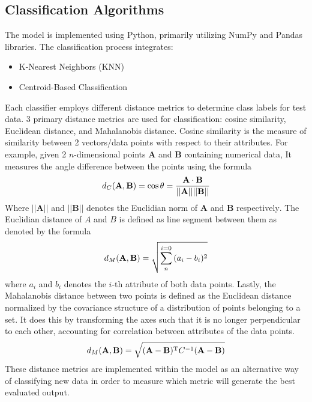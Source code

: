 \documentclass[twocolumn, a4paper, 8pt]{article}
\newcommand{\sups}[1]{\textsuperscript{#1}}
\begin{document}
	\subsection{Classification Algorithms}
	\label{sec:classification}
	The model is implemented using Python, primarily utilizing NumPy and Pandas libraries. The classification process integrates:
	\begin{itemize}
		\item K-Nearest Neighbors (KNN)
		\item Centroid-Based Classification
	\end{itemize}
	Each classifier employs different distance metrics to determine class labels for test data. 3 primary distance metrics are used for classification: cosine similarity, Euclidean distance, and Mahalanobis distance. Cosine similarity is the measure of similarity between 2 vectors/data points with respect to their attributes. For example, given 2 $n$-dimensional points $\mathbf A$ and $\mathbf B$ containing numerical data, It measures the angle difference between the points using the formula
	\begin{equation*}
		\centering
			d_C(\mathbf A, \mathbf B) = \cos{\theta} = \frac{\mathbf A \cdot \mathbf B}{||\mathbf A ||||\mathbf B||}
	\end{equation*}
	Where $||\mathbf A||$ and $||\mathbf B||$ denotes the Euclidian norm of $\mathbf A$ and $\mathbf B$ respectively\sups{\cite{HAN201239}}. The Euclidian distance of $A$ and $B$ is defined as line segment between them as denoted by the formula
	\begin{equation*}
		\centering
			d_M(\mathbf A, \mathbf B) = \sqrt{\sum_{n}^{i=0}{(a_i-b_i)^2}}
	\end{equation*}
	where $a_i$ and $b_i$ denotes the $i$-th attribute of both data points\sups{\cite{tabak2014geometry}}. Lastly, the Mahalanobis distance between two points is defined as the Euclidean distance normalized by the covariance structure of a distribution of points belonging to a set. It does this by transforming the axes such that it is no longer perpendicular to each other, accounting for correlation between attributes of the data points\sups{\cite{stephanie_2017_mahalanobis, mclachlan_1999}}.
	\begin{equation*}
		\centering
			d_M(\mathbf A, \mathbf B) = \sqrt{(\mathbf A - \mathbf B)^\text{T} C^{-1} (\mathbf A - \mathbf B)}
	\end{equation*}
	These distance metrics are implemented within the model as an alternative way of classifying new data in order to measure which metric will generate the best evaluated output.
	
\end{document}
